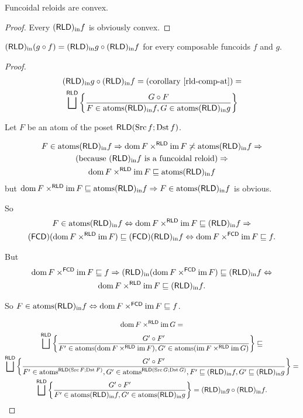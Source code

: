 \begin{cor}
Funcoidal reloids are convex.\end{cor}
\begin{proof}
Every $\torldin f$ is obviously convex.\end{proof}
\begin{thm}
$\torldin(g\circ f)=\torldin g\circ\torldin f$ for every composable
funcoids $f$ and $g$.\end{thm}
\begin{proof}
~
\begin{multline*}
\torldin g\circ\torldin f=\text{(corollary \ref{rld-comp-at})}=\\
\bigsqcup^{\mathsf{RLD}}\setcond{G\circ F}{F\in\atoms\torldin f,G\in\atoms\torldin g}
\end{multline*}


Let $F$ be an atom of the poset $\mathsf{RLD}(\Src f;\Dst f)$.

\begin{multline*}
F\in\atoms\torldin f\Rightarrow\dom F\times^{\mathsf{RLD}}\im F\nasymp\atoms\torldin f\Rightarrow\\
\text{(because \ensuremath{\torldin f} is a funcoidal reloid)}\Rightarrow\\
\dom F\times^{\mathsf{RLD}}\im F\sqsubseteq\atoms\torldin f
\end{multline*}
 but $\dom F\times^{\mathsf{RLD}}\im F\sqsubseteq\atoms\torldin f\Rightarrow F\in\atoms\torldin f$
is obvious.

So 
\begin{multline*}
F\in\atoms\torldin f\Leftrightarrow\dom F\times^{\mathsf{RLD}}\im F\sqsubseteq\torldin f\Rightarrow\\
\tofcd(\dom F\times^{\mathsf{RLD}}\im F)\sqsubseteq\tofcd\torldin f\Leftrightarrow\dom F\times^{\mathsf{FCD}}\im F\sqsubseteq f.
\end{multline*}


But 
\begin{multline*}
\dom F\times^{\mathsf{FCD}}\im F\sqsubseteq f\Rightarrow\torldin(\dom F\times^{\mathsf{FCD}}\im F)\sqsubseteq\torldin f\Leftrightarrow\\
\dom F\times^{\mathsf{RLD}}\im F\sqsubseteq\torldin f.
\end{multline*}


So $F\in\atoms\torldin f\Leftrightarrow\dom F\times^{\mathsf{FCD}}\im F\sqsubseteq f$.

\begin{multline*}
\dom F\times^{\mathsf{RLD}}\im G=\\
\bigsqcup^{\mathsf{RLD}}\setcond{G'\circ F'}{F'\in\atoms(\dom F\times^{\mathsf{RLD}}\im F),G'\in\atoms(\im F\times^{\mathsf{RLD}}\im G)}\sqsubseteq\\
\bigsqcup^{\mathsf{RLD}}\setcond{G'\circ F'}{F'\in\atoms^{\mathsf{RLD}(\Src F;\Dst F)},G'\in\atoms^{\mathsf{RLD}(\Src G;\Dst G)},F'\sqsubseteq\torldin f,G'\sqsubseteq\torldin g}=\\
\bigsqcup^{\mathsf{RLD}}\setcond{G'\circ F'}{F'\in\atoms\torldin f,G'\in\atoms\torldin g}=\torldin g\circ\torldin f.
\end{multline*}



\end{proof}
